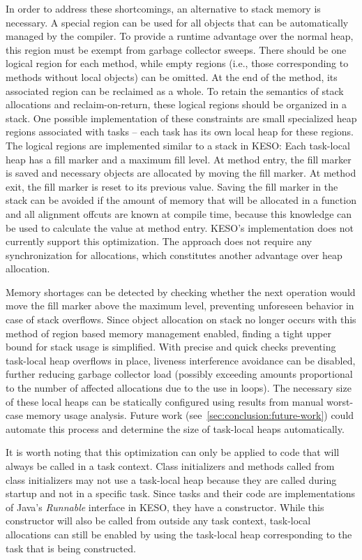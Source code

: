 			In order to address these shortcomings, an alternative to stack memory is necessary. A special region can be used
			for all objects that can be automatically managed by the compiler. To provide a runtime advantage over the normal
			heap, this region must be exempt from garbage collector sweeps. There should be one logical region for each
			method, while empty regions (i.e., those corresponding to methods without local objects) can be omitted. At the
			end of the method, its associated region can be reclaimed as a whole. To retain the semantics of stack allocations
			and reclaim-on-return, these logical regions should be organized in a stack. One possible implementation of these
			constraints are small specialized heap regions associated with tasks – each task has its own local heap for these
			regions. The logical regions are implemented similar to a stack in KESO: Each task-local heap has a fill marker
			and a maximum fill level. At method entry, the fill marker is saved and necessary objects are allocated by moving
			the fill marker. At method exit, the fill marker is reset to its previous value. Saving the fill marker in the
			stack can be avoided if the amount of memory that will be allocated in a function and all alignment offcuts are
			known at compile time, because this knowledge can be used to calculate the value at method entry. KESO's
			implementation does not currently support this optimization. The approach does not require any synchronization for
			allocations, which constitutes another advantage over heap allocation.

			Memory shortages can be detected by checking whether the next operation would move the fill marker above the
			maximum level, preventing unforeseen behavior in case of stack overflows. Since object allocation on stack no
			longer occurs with this method of region based memory management enabled, finding a tight upper bound for stack
			usage is simplified. With precise and quick checks preventing task-local heap overflows in place, liveness
			interference avoidance can be disabled, further reducing garbage collector load (possibly exceeding amounts
			proportional to the number of affected allocations due to the use in loops). The necessary size of these local
			heaps can be statically configured using results from manual worst-case memory usage analysis. Future work
			(see~\cref{sec:conclusion:future-work}) could automate this process and determine the size of task-local heaps
			automatically.

			It is worth noting that this optimization can only be applied to code that will always be called in a task
			context. Class initializers and methods called from class initializers may not use a task-local heap because they
			are called during startup and not in a specific task. Since tasks and their code are implementations of Java's
			\emph{Runnable} interface in KESO, they have a constructor. While this constructor will also be called from
			outside any task context, task-local allocations can still be enabled by using the task-local heap corresponding
			to the task that is being constructed.

